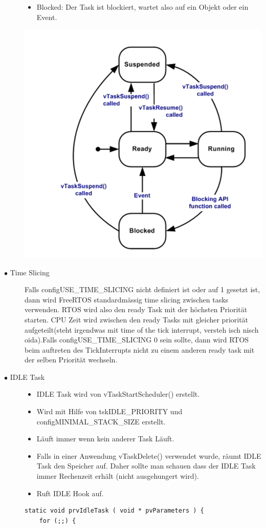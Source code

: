 \documentclass[a4paper, 8pt]{extarticle}
\begin{document}
\begin{multicols*}{3}
\begin{description}
\begin{itemize}
								\item Blocked: Der Task ist blockiert, wartet also auf ein Objekt oder ein Event.
							\end{itemize}
							\includegraphics[width=0.6\linewidth,left]{img/Task_State_transistions.PNG}
					\item[$\bullet$ Time Slicing]  
						Falls configUSE\_TIME\_SLICING nicht definiert ist oder auf 1 gesetzt ist, dann wird FreeRTOS standardmässig time slicing zwischen tasks verwenden. 
						RTOS wird also den ready Task mit der höchsten Priorität starten. CPU Zeit wird zwischen den ready Tasks mit gleicher priorität aufgeteilt(steht irgendwas 
						mit time of the tick interrupt, versteh isch nisch oida).Falls configUSE\_TIME\_SLICING 0 sein sollte, dann wird RTOS beim auftreten des TickInterrupts nicht zu einem anderen ready task mit der 
						selben Priorität wechseln.
					\item[$\bullet$ IDLE Task]
						\begin{itemize}
							\item IDLE Task wird von vTaskStartScheduler() erstellt.
							\item Wird mit Hilfe von tskIDLE\_PRIORITY und configMINIMAL\_STACK\_SIZE erstellt.
							\item Läuft immer wenn kein anderer Task Läuft.
							\item Falls in einer Anwendung vTaskDelete() verwendet wurde, räumt IDLE Task den Speicher auf.
								Daher sollte man schauen dass der IDLE Task immer Rechenzeit erhält (nicht ausgehungert wird).
							\item Ruft IDLE Hook auf.
						\end{itemize}
						\begin{lstlisting}
static void prvIdleTask ( void * pvParameters ) {
	for (;;) {

\end{lstlisting}
\end{description}
\end{multicols*}
\end{document}
